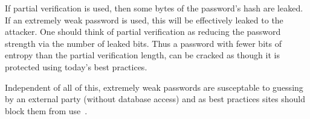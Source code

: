 If partial verification is used, then some bytes of the password's 
hash are leaked.   If an extremely weak password is used, this
will be effectively leaked to the attacker.   One should think of partial
verification as reducing the password strength via the number of leaked
bits.   Thus a password with fewer bits of entropy than the partial 
verification length, can be cracked as though it is protected using today's
best practices.


Independent of all of this, extremely weak passwords are susceptable to 
guessing by an external party (without database access) and as best practices
sites should block them from use~\cite{bancommonpasswords}.




